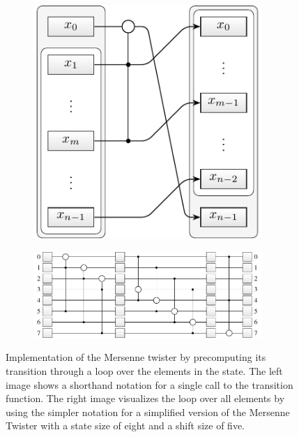 \documentclass{stdlocal}
\begin{document}
    \begin{figure}
      \center
      \begin{subfigure}[b]{0.26\textwidth}
        \center
        \includegraphics[width=0.95\textwidth]{figures/mt19937_transition_short.pdf}
      \end{subfigure}
      \begin{subfigure}[b]{0.71\textwidth}
        \center
        \includegraphics[width=0.95\textwidth]{figures/mt19937_loop_scheme.pdf}
      \end{subfigure}
      \caption[Mersenne Twister Loop Scheme]{
        Implementation of the Mersenne twister by precomputing its transition through a loop over the elements in the state.
        The left image shows a shorthand notation for a single call to the transition function.
        The right image visualizes the loop over all elements by using the simpler notation for a simplified version of the Mersenne Twister with a state size of eight and a shift size of five.
      }
      \label{fig:mt-loop-scheme}
    \end{figure}
\end{document}
